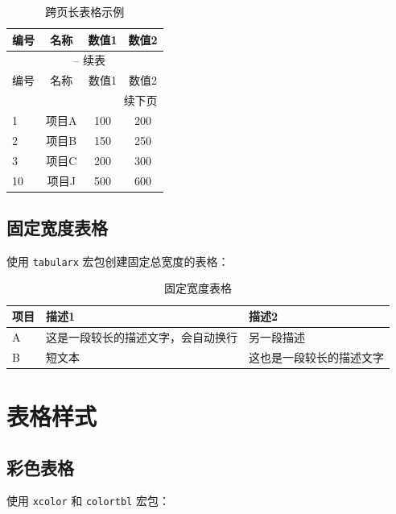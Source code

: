 \begin{longtable}{lccc}
  \caption{跨页长表格示例} \label{tab:long} \\
  \toprule
  编号 & 名称 & 数值1 & 数值2 \\
  \midrule
  \endfirsthead
  
  \multicolumn{4}{c}{{\tablename\ \thetable{} -- 续表}} \\
  \toprule
  编号 & 名称 & 数值1 & 数值2 \\
  \midrule
  \endhead
  
  \midrule
  \multicolumn{4}{r}{{续下页}} \\
  \endfoot
  
  \bottomrule
  \endlastfoot
  
  1 & 项目A & 100 & 200 \\
  2 & 项目B & 150 & 250 \\
  3 & 项目C & 200 & 300 \\
  10 & 项目J & 500 & 600 \\
\end{longtable}

\subsection{固定宽度表格}

使用 \texttt{tabularx} 宏包创建固定总宽度的表格：

\begin{table}[htbp]
  \centering
  \caption{固定宽度表格}
  \begin{tabularx}{\textwidth}{lXX}
    \toprule
    项目 & 描述1 & 描述2 \\
    \midrule
    A & 这是一段较长的描述文字，会自动换行 & 另一段描述 \\
    B & 短文本 & 这也是一段较长的描述文字 \\
    \bottomrule
  \end{tabularx}
\end{table}

\section{表格样式}

\subsection{彩色表格}

使用 \texttt{xcolor} 和 \texttt{colortbl} 宏包：

